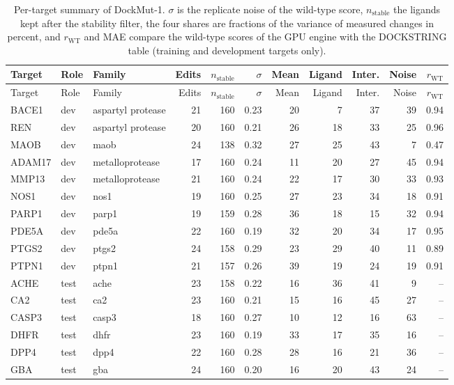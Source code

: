 \begin{longtable}{llp{2.4cm}rrrrrrrr}
\caption{Per-target summary of DockMut-1. $\sigma$ is the replicate noise of the wild-type score, $n_\mathrm{stable}$ the ligands kept after the stability filter, the four shares are fractions of the variance of measured changes in percent, and $r_\mathrm{WT}$ and MAE compare the wild-type scores of the GPU engine with the DOCKSTRING table (training and development targets only).}
\label{tab:si_targets}\\
\toprule
Target & Role & Family & Edits & $n_\mathrm{stable}$ & $\sigma$ & Mean & Ligand & Inter. & Noise & $r_\mathrm{WT}$ \\
\midrule
\endfirsthead
Target & Role & Family & Edits & $n_\mathrm{stable}$ & $\sigma$ & Mean & Ligand & Inter. & Noise & $r_\mathrm{WT}$ \\
\midrule
\endhead
BACE1 & dev & aspartyl protease & 21 & 160 & 0.23 & 20 & 7 & 37 & 39 & 0.94 \\
REN & dev & aspartyl protease & 20 & 160 & 0.21 & 26 & 18 & 33 & 25 & 0.96 \\
MAOB & dev & maob & 24 & 138 & 0.32 & 27 & 25 & 43 & 7 & 0.47 \\
ADAM17 & dev & metalloprotease & 17 & 160 & 0.24 & 11 & 20 & 27 & 45 & 0.94 \\
MMP13 & dev & metalloprotease & 21 & 160 & 0.24 & 22 & 17 & 30 & 33 & 0.93 \\
NOS1 & dev & nos1 & 19 & 160 & 0.25 & 27 & 23 & 34 & 18 & 0.91 \\
PARP1 & dev & parp1 & 19 & 159 & 0.28 & 36 & 18 & 15 & 32 & 0.94 \\
PDE5A & dev & pde5a & 22 & 160 & 0.19 & 32 & 20 & 34 & 17 & 0.95 \\
PTGS2 & dev & ptgs2 & 24 & 158 & 0.29 & 23 & 29 & 40 & 11 & 0.89 \\
PTPN1 & dev & ptpn1 & 21 & 157 & 0.26 & 39 & 19 & 24 & 19 & 0.91 \\
ACHE & test & ache & 23 & 158 & 0.22 & 16 & 36 & 41 & 9 & -- \\
CA2 & test & ca2 & 23 & 160 & 0.21 & 15 & 16 & 45 & 27 & -- \\
CASP3 & test & casp3 & 18 & 160 & 0.27 & 10 & 12 & 16 & 63 & -- \\
DHFR & test & dhfr & 23 & 160 & 0.19 & 33 & 17 & 35 & 16 & -- \\
DPP4 & test & dpp4 & 22 & 160 & 0.28 & 28 & 16 & 21 & 36 & -- \\
GBA & test & gba & 24 & 160 & 0.20 & 16 & 20 & 43 & 24 & -- \\

\end{longtable}
